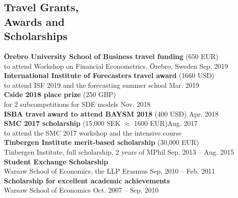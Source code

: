 \documentclass[margin,line]{resume}
\begin{document}
\begin{resume}
\vspace{-1mm}
 
\section{\mysidestyle Travel Grants,\\Awards and \\ Scholarships}	
   	\textbf{\"{O}rebro University School of Business travel funding} (650 EUR) \\
    to attend Workshop on Financial Econometrics, \"{O}rebro, Sweden
   	\hfill Sep. 2019 \vspace{1.5mm} \\    	\textbf{International Institute of Forecasters travel award} (1660 USD)\\
    to attend ISF 2019 and the forecasting summer school%
   	\hfill Mar. 2019 \vspace{1.5mm} \\ 
   	\textbf{Cside 2018  place  prize} (250 GBP) \\
   	for 2 subcompetitions for SDE models%
   	 \hfill Nov. 2018 \vspace{1.5mm} \\ 
   	\textbf{ISBA travel award to attend BAYSM 2018} (400 USD)  \hfill Apr. 2018 \vspace{1.5mm} \\ %
   	\textbf{SMC 2017 scholarship} (15,000 SEK $\approx$ 1600 EUR)\hfill Aug. 2017  \\  to attend the SMC 2017 workshop and the intensive course \vspace{1.5mm}\\ %
   	\textbf{Tinbergen Institute merit-based scholarship} (30,000 EUR) \\ 
   	Tinbergen Institute, full scholarship, 2 years of MPhil%
   	\hfill Sep. 2013 -- Aug. 2015\vspace{1.5mm} \\   
       \textbf{Student Exchange Scholarship}\\  Warsaw School of Economics, the LLP Erasmus \hfill Sep. 2010 -- Feb. 2011\vspace{1.5mm} \\
       \textbf{Scholarship for excellent academic achievements}\\ Warsaw School of Economics \hfill Oct. 2007 -- Sep. 2010 
       

\end{resume}
\end{document}

